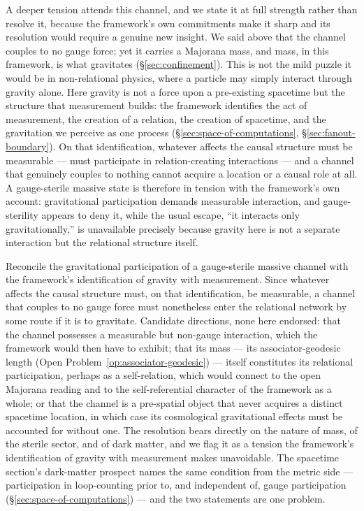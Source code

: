 A deeper tension attends this channel, and we state it at full strength rather than resolve it,
because the framework's own commitments make it sharp and its resolution would require a genuine new
insight. We said above that the channel couples to no gauge force; yet it carries a Majorana mass, and mass,
in this framework, is what gravitates (\S\ref{sec:confinement}). This is not the mild puzzle it would
be in non-relational physics, where a particle may simply interact through gravity alone. Here
gravity is not a force upon a pre-existing spacetime but the structure that measurement builds: the
framework identifies the act of measurement, the creation of a relation, the creation of spacetime,
and the gravitation we perceive as one process (\S\ref{sec:space-of-computations},
\S\ref{sec:fanout-boundary}). On that identification, whatever affects the causal structure must be
measurable --- must participate in relation-creating interactions --- and a channel that genuinely
couples to nothing cannot acquire a location or a causal role at all. A gauge-sterile massive state
is therefore in tension with the framework's own account: gravitational participation demands
measurable interaction, and gauge-sterility appears to deny it, while the usual escape, ``it
interacts only gravitationally,'' is unavailable precisely because gravity here is not a separate
interaction but the relational structure itself.

\begin{openproblem}\label{op:sterile-gravity}
Reconcile the gravitational participation of a gauge-sterile massive channel with the framework's
identification of gravity with measurement. Since whatever affects the causal structure must, on that
identification, be measurable, a channel that couples to no gauge force must nonetheless enter the
relational network by some route if it is to gravitate. Candidate directions, none here endorsed: that
the channel possesses a measurable but non-gauge interaction, which the framework would then have to
exhibit; that its mass --- its associator-geodesic length (Open Problem~\ref{op:associator-geodesic})
--- itself constitutes its relational participation, perhaps as a self-relation, which would connect
to the open Majorana reading and to the self-referential character of the framework as a whole; or
that the channel is a pre-spatial object that never acquires a distinct spacetime location, in which
case its cosmological gravitational effects must be accounted for without one. The resolution bears
directly on the nature of mass, of the sterile sector, and of dark matter, and we flag it as a
tension the framework's identification of gravity with measurement makes unavoidable.
 The spacetime section's dark-matter prospect names the same condition from the
metric side --- participation in loop-counting prior to, and independent of, gauge participation
(\S\ref{sec:space-of-computations}) --- and the two statements are one problem.
\end{openproblem}

